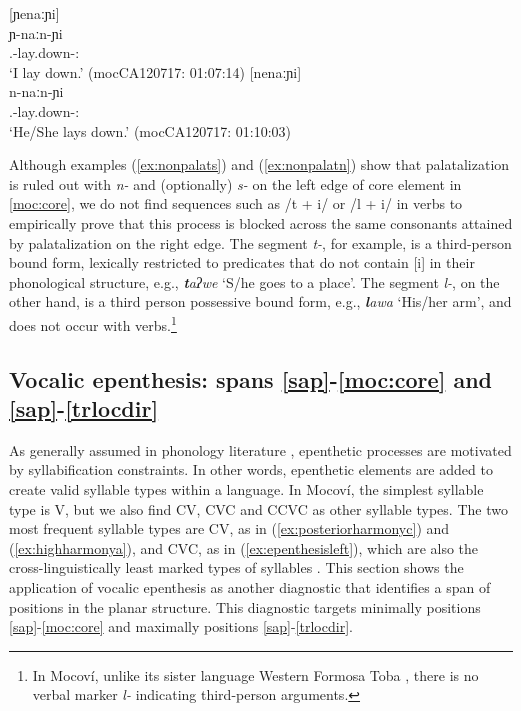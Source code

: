 \documentclass[output=paper]{langscibook}
\begin{document}
\ea\label{ex:paradgmdist}
\ea\label{ex:paradgmdista}
 [ɲenaːɲi]\\
\gll ɲ-naːn-ɲi\\
{\First.\III}-lay.down-{\Dir:\Down}\\
\glt `I lay down.' \hfill(mocCA120717: 01:07:14)
\ex\label{ex:paradgmdistb}
[nenaːɲi]\\
\gll n-naːn-ɲi\\
{\Third.\III}-lay.down-{\Dir:\Down}\\
\glt `He/She lays down.' \hfill(mocCA120717: 01:10:03)
\z
\z

Although examples (\ref{ex:nonpalats}) and (\ref{ex:nonpalatn}) show that palatalization is ruled out with \textit{n-} and (optionally) \textit{s-} on the left edge of core element in \ref{moc:core}, we do not find sequences such as /t + i/ or /l + i/ in verbs to empirically prove that this process is blocked across the same consonants attained by palatalization on the right edge. The segment \textit{t-}, for example, is a third-person bound form, lexically restricted to predicates that do not contain [i] in their phonological structure, e.g., \textit{\textbf{t}aʔwe} `S/he goes to a place'. The segment \textit{l-}, on the other hand, is a third person possessive bound form, e.g., \textit{\textbf{l}awa} `His/her arm', and does not occur with verbs.\footnote{In Mocoví, unlike its sister language Western Formosa Toba \citep[see][]{Carpio2012a}, there is no verbal marker \textit{l-} indicating third-person arguments.}    


\subsection{Vocalic epenthesis: spans \ref{sap}-\ref{moc:core} and \ref{sap}-\ref{trlocdir}} 
\label{sec:epenthesis}

As generally assumed in phonology literature \citep[e.g.,][263]{Hayes}, epenthetic processes are motivated by syllabification constraints. In other words, epenthetic elements are added to create valid syllable types within a language. In Mocoví, the simplest syllable type is V, but we also find CV, CVC and CCVC as other syllable types. The two most frequent syllable types are CV, as in (\ref{ex:posteriorharmonyc}) and (\ref{ex:highharmonya}), and CVC, as in (\ref{ex:epenthesisleft}), which are also the cross-linguistically least marked types of syllables \citep[84--85]{Gordon2016}. 
This section shows the application of vocalic epenthesis as another diagnostic that identifies a span of positions in the planar structure. This diagnostic targets minimally positions \ref{sap}-\ref{moc:core} and maximally positions \ref{sap}-\ref{trlocdir}.
\end{document}
